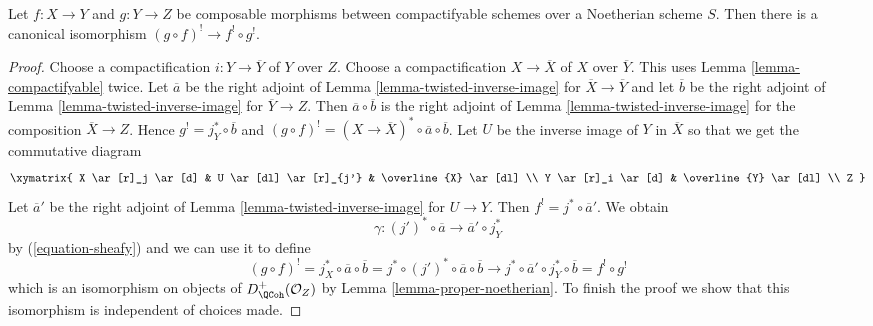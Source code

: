 \begin{lemma}
\label{lemma-upper-shriek-composition}
Let $f : X \to Y$ and $g : Y \to Z$ be composable
morphisms between compactifyable
schemes over a Noetherian scheme $S$. Then there is a canonical
isomorphism $(g \circ f)^! \to f^! \circ g^!$.
\end{lemma}

\begin{proof}
Choose a compactification $i : Y \to \overline{Y}$ of $Y$ over $Z$.
Choose a compactification $X \to \overline{X}$ of $X$ over
$\overline{Y}$. This uses Lemma \ref{lemma-compactifyable} twice.
Let $\overline{a}$ be the
right adjoint of Lemma \ref{lemma-twisted-inverse-image} for
$\overline{X} \to \overline{Y}$ and let $\overline{b}$
be the
right adjoint of Lemma \ref{lemma-twisted-inverse-image} for
$\overline{Y} \to Z$.
Then $\overline{a} \circ \overline{b}$ is the
right adjoint of Lemma \ref{lemma-twisted-inverse-image} for
the composition $\overline{X} \to Z$.
Hence $g^! = j_Y^* \circ \overline{b}$ and
$(g \circ f)^! = (X \to \overline{X})^* \circ \overline{a} \circ \overline{b}$.
Let $U$ be the inverse image of $Y$ in $\overline{X}$
so that we get the commutative diagram
$$
\xymatrix{
X \ar[r]_j \ar[d] & U \ar[dl] \ar[r]_{j'} & \overline{X} \ar[dl] \\
Y \ar[r]_i \ar[d] & \overline{Y} \ar[dl] \\
Z
}
$$
Let $\overline{a}'$ be the
right adjoint of Lemma \ref{lemma-twisted-inverse-image} for
$U \to Y$.
Then $f^! = j^* \circ \overline{a}'$. We obtain
$$
\gamma : (j')^* \circ \overline{a} \to \overline{a}' \circ j_Y^*
$$
by (\ref{equation-sheafy}) and we can use it to define
$$
(g \circ f)^! =
j_X^* \circ \overline{a} \circ \overline{b} =
j^* \circ (j')^* \circ \overline{a} \circ \overline{b}
\to
j^* \circ \overline{a}' \circ j_Y^* \circ \overline{b} =
f^! \circ g^!
$$
which is an isomorphism on objects of $D_\QCoh^+(\mathcal{O}_Z)$ by
Lemma \ref{lemma-proper-noetherian}. To finish the proof we show that
this isomorphism is independent of choices made.


\end{proof}
